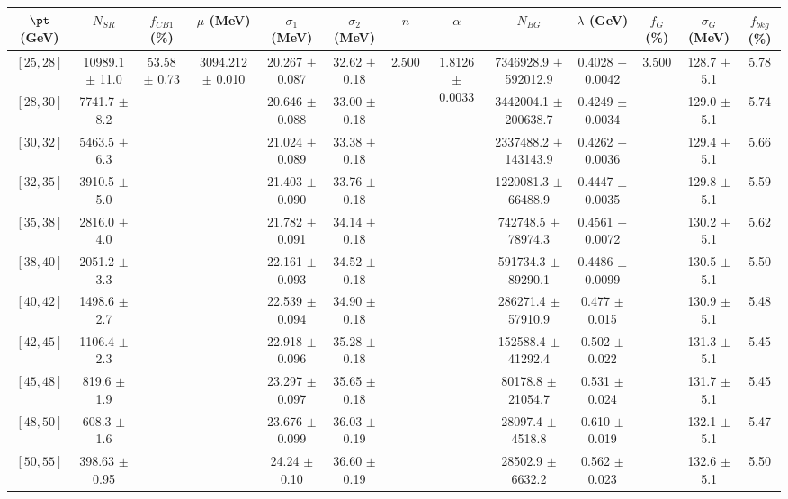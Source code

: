 \begin{tabular}{c||c|c|c|c|c|c|c|c|c|c|c||c}
$\pt$ (GeV) & $N_{SR}$ & $f_{CB1}$ (\%) & $\mu$ (MeV) & $\sigma_1$ (MeV) & $\sigma_2$ (MeV) & $n$ & $\alpha$ & $N_{BG}$ & $\lambda$ (GeV) & $f_G$ (\%) & $\sigma_G$ (MeV) & $f_{bkg}$ (\%) \\
\hline
$[25, 28]$ & 10989.1 $\pm$ 11.0 & \multirow{19}{*}{53.58 $\pm$ 0.73} & \multirow{19}{*}{3094.212 $\pm$ 0.010} & 20.267 $\pm$ 0.087 & 32.62 $\pm$ 0.18 & \multirow{19}{*}{2.500} & \multirow{19}{*}{1.8126 $\pm$ 0.0033} & 7346928.9 $\pm$ 592012.9 & 0.4028 $\pm$ 0.0042 & \multirow{19}{*}{3.500} & 128.7 $\pm$ 5.1 & 5.78\\
$[28, 30]$ & 7741.7 $\pm$ 8.2 &  &  & 20.646 $\pm$ 0.088 & 33.00 $\pm$ 0.18 &  &  & 3442004.1 $\pm$ 200638.7 & 0.4249 $\pm$ 0.0034 &  & 129.0 $\pm$ 5.1 & 5.74\\
$[30, 32]$ & 5463.5 $\pm$ 6.3 &  &  & 21.024 $\pm$ 0.089 & 33.38 $\pm$ 0.18 &  &  & 2337488.2 $\pm$ 143143.9 & 0.4262 $\pm$ 0.0036 &  & 129.4 $\pm$ 5.1 & 5.66\\
$[32, 35]$ & 3910.5 $\pm$ 5.0 &  &  & 21.403 $\pm$ 0.090 & 33.76 $\pm$ 0.18 &  &  & 1220081.3 $\pm$ 66488.9 & 0.4447 $\pm$ 0.0035 &  & 129.8 $\pm$ 5.1 & 5.59\\
$[35, 38]$ & 2816.0 $\pm$ 4.0 &  &  & 21.782 $\pm$ 0.091 & 34.14 $\pm$ 0.18 &  &  & 742748.5 $\pm$ 78974.3 & 0.4561 $\pm$ 0.0072 &  & 130.2 $\pm$ 5.1 & 5.62\\
$[38, 40]$ & 2051.2 $\pm$ 3.3 &  &  & 22.161 $\pm$ 0.093 & 34.52 $\pm$ 0.18 &  &  & 591734.3 $\pm$ 89290.1 & 0.4486 $\pm$ 0.0099 &  & 130.5 $\pm$ 5.1 & 5.50\\
$[40, 42]$ & 1498.6 $\pm$ 2.7 &  &  & 22.539 $\pm$ 0.094 & 34.90 $\pm$ 0.18 &  &  & 286271.4 $\pm$ 57910.9 & 0.477 $\pm$ 0.015 &  & 130.9 $\pm$ 5.1 & 5.48\\
$[42, 45]$ & 1106.4 $\pm$ 2.3 &  &  & 22.918 $\pm$ 0.096 & 35.28 $\pm$ 0.18 &  &  & 152588.4 $\pm$ 41292.4 & 0.502 $\pm$ 0.022 &  & 131.3 $\pm$ 5.1 & 5.45\\
$[45, 48]$ & 819.6 $\pm$ 1.9 &  &  & 23.297 $\pm$ 0.097 & 35.65 $\pm$ 0.18 &  &  & 80178.8 $\pm$ 21054.7 & 0.531 $\pm$ 0.024 &  & 131.7 $\pm$ 5.1 & 5.45\\
$[48, 50]$ & 608.3 $\pm$ 1.6 &  &  & 23.676 $\pm$ 0.099 & 36.03 $\pm$ 0.19 &  &  & 28097.4 $\pm$ 4518.8 & 0.610 $\pm$ 0.019 &  & 132.1 $\pm$ 5.1 & 5.47\\
$[50, 55]$ & 398.63 $\pm$ 0.95 &  &  & 24.24 $\pm$ 0.10 & 36.60 $\pm$ 0.19 &  &  & 28502.9 $\pm$ 6632.2 & 0.562 $\pm$ 0.023 &  & 132.6 $\pm$ 5.1 & 5.50\\

\end{tabular}

